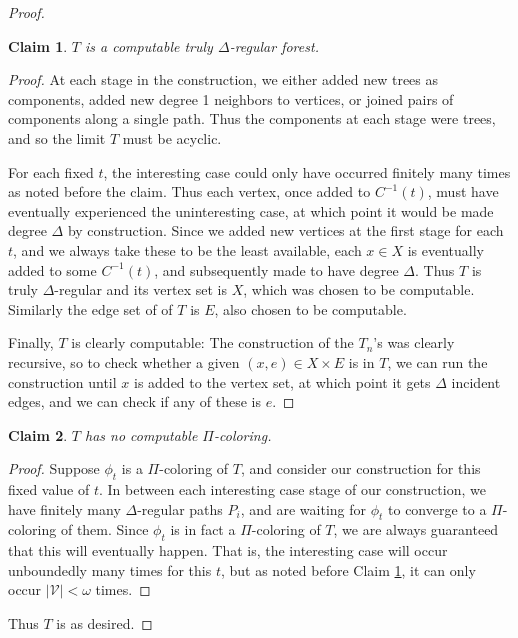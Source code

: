 \documentclass[10pt,a4paper]{amsart}
\newtheorem{claim}{Claim}
\newcommand{\inv}{^{-1}}
\begin{document}
\begin{proof}
\begin{claim}\label{claim:computable}
$T$ is a computable truly $\Delta$-regular forest.
\end{claim}
\begin{proof}
At each stage in the construction, we either added new trees as components, added new degree 1 neighbors to vertices, or joined pairs of components along a single path. Thus the components at each stage were trees, and so the limit $T$ must be acyclic.

For each fixed $t$, the interesting case could only have occurred finitely many times as noted before the claim. Thus each vertex, once added to $C\inv(t)$, must have eventually experienced the uninteresting case, at which point it would be made degree $\Delta$ by construction. Since we added new vertices at the first stage for each $t$, and we always take these to be the least available, each $x \in X$ is eventually added to some $C\inv(t)$, and subsequently made to have degree $\Delta$. Thus $T$ is truly $\Delta$-regular and its vertex set is $X$, which was chosen to be computable. Similarly the edge set of of $T$ is $E$, also chosen to be computable.

Finally, $T$ is clearly computable: The construction of the $T_n$'s was clearly recursive, so to check whether a given $(x,e) \in X \times E$ is in $T$, we can run the construction until $x$ is added to the vertex set, at which point it gets $\Delta$ incident edges, and we can check if any of these is $e$.
\end{proof}

\begin{claim}
$T$ has no computable $\Pi$-coloring.
\end{claim}

\begin{proof}
Suppose $\phi_t$ is a $\Pi$-coloring of $T$, and consider our construction for this fixed value of $t$. In between each interesting case stage of our construction, we have finitely many $\Delta$-regular paths $P_i$, and are waiting for $\phi_t$ to converge to a $\Pi$-coloring of them. Since $\phi_t$ is in fact a $\Pi$-coloring of $T$, we are always guaranteed that this will eventually happen. That is, the interesting case will occur unboundedly many times for this $t$, but as noted before Claim \ref{claim:computable}, it can only occur $|\mathcal{V}| < \omega$ times.
\end{proof}

Thus $T$ is as desired.

\end{proof}
\end{document}
